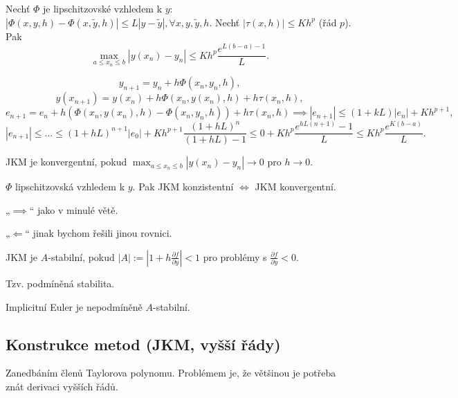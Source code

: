 \documentclass[12pt]{article}					%
\begin{document}
\begin{veta}
	Nechť $\Phi$ je lipschitzovské vzhledem k $y$: $|\Phi(x, y, h) - \Phi(x, \tilde y, h)| ≤ L|y - \tilde y|, \forall x, y, \tilde y, h$. Nechť $|\tau(x, h)| ≤ Kh^p$ (řád $p$). Pak
	$$ \max_{a ≤ x_n ≤ b} |y(x_n) - y_n| ≤ K h^p \frac{e^{L(b - a) - 1}}{L}. $$

	\begin{dukazin}
		$$ y_{n+1} = y_n + h \Phi(x_n, y_n, h), $$
		$$ y(x_{n+1}) = y(x_n) + h \Phi(x_n, y(x_n), h) + h\tau(x_n, h), $$
		$$ e_{n+1} = e_n + h(\Phi(x_n, y(x_n), h) - \Phi(x_n, y_n, h)) + h \tau(x_n, h) \implies |e_{n+1}| ≤ (1 + kL) |e_n| + Kh^{p + 1}, $$
		$$ |e_{n+1}| ≤ … ≤ (1+hL)^{n+1} |e_0| + Kh^{p+1} \frac{(1 + hL)^n}{(1 + hL) - 1} ≤ 0 + Kh^p \frac{e^{hL(n+1)} - 1}{L} ≤ Kh^p \frac{e^{K(b - a)}}{L}. $$
	\end{dukazin}
\end{veta}

\begin{definice}
	JKM je konvergentní, pokud $\max_{a ≤ x_n ≤ b} |y(x_n) - y_n| \rightarrow 0$ pro $h \rightarrow 0$.
\end{definice}

\begin{veta}
	$\Phi$ lipschitzovská vzhledem k $y$. Pak JKM konzistentní $\Leftrightarrow$ JKM konvergentní.

	\begin{dukazin}
		„$\implies$“ jako v minulé větě.

		„$\Leftarrow$“ jinak bychom řešili jinou rovnici.
	\end{dukazin}
\end{veta}

\begin{definice}
	JKM je $A$-stabilní, pokud $|A| := |1 + h\frac{\partial f}{\partial y}| < 1$ pro problémy s $\frac{\partial f}{\partial y} < 0$.

	Tzv. podmíněná stabilita.

	\begin{prikladyin}
		Implicitní Euler je nepodmíněně $A$-stabilní.
	\end{prikladyin}
\end{definice}

	\subsection{Konstrukce metod (JKM, vyšší řády)}
	\begin{definice}
		Zanedbáním členů Taylorova polynomu. Problémem je, že většinou je potřeba znát derivaci vyšších řádů.
	\end{definice}
\end{document}
